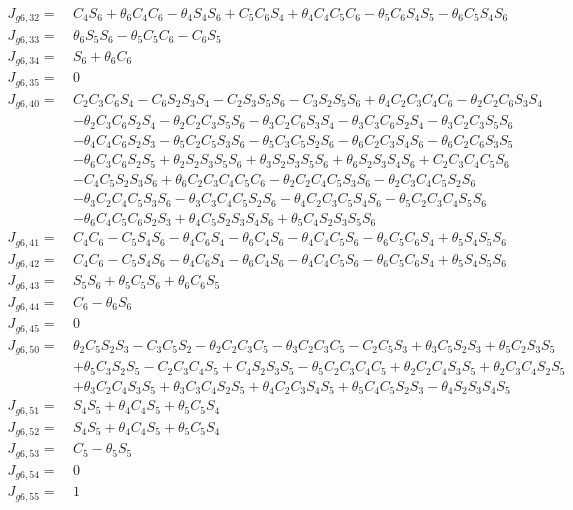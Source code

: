 \documentclass[12pt]{article}
\begin{document}
\begin{CJK}{UTF8}{bsmi}
\begin{equation*}
\begin{split}
J_{g6,32} =\  &C_4S_6 + \theta _6C_4C_6 - \theta _4S_4S_6 + C_5C_6S_4 + \theta _4C_4C_5C_6 - \theta _5C_6S_4S_5 - \theta _6C_5S_4S_6\\
J_{g6,33} =\  &\theta _6S_5S_6 - \theta _5C_5C_6 - C_6S_5\\
J_{g6,34} =\  &S_6 + \theta _6C_6\\
J_{g6,35} =\  &0\\
J_{g6,40} =\  &C_2C_3C_6S_4 - C_6S_2S_3S_4 - C_2S_3S_5S_6 - C_3S_2S_5S_6 + \theta _4C_2C_3C_4C_6 - \theta _2C_2C_6S_3S_4\\
			  & - \theta _2C_3C_6S_2S_4 - \theta _2C_2C_3S_5S_6 - \theta _3C_2C_6S_3S_4 - \theta _3C_3C_6S_2S_4 - \theta _3C_2C_3S_5S_6\\
			  & - \theta _4C_4C_6S_2S_3 - \theta _5C_2C_5S_3S_6 - \theta _5C_3C_5S_2S_6 - \theta _6C_2C_3S_4S_6 - \theta _6C_2C_6S_3S_5\\
			  & - \theta _6C_3C_6S_2S_5 + \theta _2S_2S_3S_5S_6 + \theta _3S_2S_3S_5S_6 + \theta _6S_2S_3S_4S_6 + C_2C_3C_4C_5S_6\\
			  & - C_4C_5S_2S_3S_6 + \theta _6C_2C_3C_4C_5C_6 - \theta _2C_2C_4C_5S_3S_6 - \theta _2C_3C_4C_5S_2S_6\\
			  & - \theta _3C_2C_4C_5S_3S_6 - \theta _3C_3C_4C_5S_2S_6 - \theta _4C_2C_3C_5S_4S_6 - \theta _5C_2C_3C_4S_5S_6\\
			  & - \theta _6C_4C_5C_6S_2S_3 + \theta _4C_5S_2S_3S_4S_6 + \theta _5C_4S_2S_3S_5S_6\\
J_{g6,41} =\  &C_4C_6 - C_5S_4S_6 - \theta _4C_6S_4 - \theta _6C_4S_6 - \theta _4C_4C_5S_6 - \theta _6C_5C_6S_4 + \theta _5S_4S_5S_6\\
J_{g6,42} =\  &C_4C_6 - C_5S_4S_6 - \theta _4C_6S_4 - \theta _6C_4S_6 - \theta _4C_4C_5S_6 - \theta _6C_5C_6S_4 + \theta _5S_4S_5S_6\\
J_{g6,43} =\  &S_5S_6 + \theta _5C_5S_6 + \theta _6C_6S_5\\
J_{g6,44} =\  &C_6 - \theta _6S_6\\
J_{g6,45} =\  &0\\
J_{g6,50} =\  &\theta _2C_5S_2S_3 - C_3C_5S_2 - \theta _2C_2C_3C_5 - \theta _3C_2C_3C_5 - C_2C_5S_3 + \theta _3C_5S_2S_3 + \theta _5C_2S_3S_5\\
			  & + \theta _5C_3S_2S_5 - C_2C_3C_4S_5 + C_4S_2S_3S_5 - \theta _5C_2C_3C_4C_5 + \theta _2C_2C_4S_3S_5 + \theta _2C_3C_4S_2S_5\\
			  & + \theta _3C_2C_4S_3S_5 + \theta _3C_3C_4S_2S_5 + \theta _4C_2C_3S_4S_5 + \theta _5C_4C_5S_2S_3 - \theta _4S_2S_3S_4S_5\\
J_{g6,51} =\  &S_4S_5 + \theta _4C_4S_5 + \theta _5C_5S_4\\
J_{g6,52} =\  &S_4S_5 + \theta _4C_4S_5 + \theta _5C_5S_4\\
J_{g6,53} =\  &C_5 - \theta _5S_5\\
J_{g6,54} =\  &0\\
J_{g6,55} =\  &1\\ 
\end{split}
\end{equation*}


\end{CJK}
\end{document}
